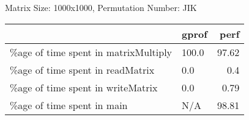 \documentclass{article}
\begin{document}
    Matrix Size: 1000x1000, Permutation Number: JIK \\
    \begin{tabular}{llr}
\hline
                                      & gprof   &   perf \\
\hline
 \%age of time spent in matrixMultiply & 100.0   &  97.62 \\
 \%age of time spent in readMatrix     & 0.0     &   0.4  \\
 \%age of time spent in writeMatrix    & 0.0     &   0.79 \\
 \%age of time spent in main           & N/A     &  98.81 \\
\hline
\end{tabular}
    
\end{document}
